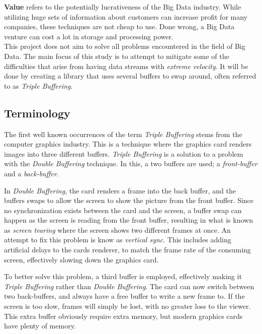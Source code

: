 \documentclass[a4paper]{article}
\begin{document}
\textbf{Value} refers to the potentially lucrativeness of the Big Data industry. While utilizing huge sets of information about customers can increase profit for many companies, these techniques are not cheap to use. Done wrong, a Big Data venture can cost a lot in storage and processing power.\\


This project does not aim to solve all problems encountered in the field of Big Data. The main focus of this study is to attempt to mitigate some of the difficulties that arise from having data streams with \textit{extreme velocity}. It will be done by creating a  library that uses several buffers to swap around, often referred to as \textit{Triple Buffering}.


\subsection{Terminology}
The first well known occurrences of the term \textit{Triple Buffering} stems from the computer graphics industry\cite{3buf}. This is a technique where the graphics card renders images into three different buffers. \textit{Triple Buffering} is a solution to a problem with the \textit{Double Buffering} technique. In this, a two buffers are used; a \textit{front-buffer} and a \textit{back-buffer}. 

In \textit{Double Buffering}, the card renders a frame into the back buffer, and the buffers swaps to allow the screen to show the picture from the front buffer. Since no synchronization exists between the card and the screen, a buffer swap can happen as the screen is reading from the front buffer, resulting in what is known as \textit{screen tearing} where the screen shows two different frames at once. An attempt to fix this problem is know as \textit{vertical sync}. This includes adding artificial delays to the cards renderer, to match the frame rate of the consuming screen, effectively slowing down the graphics card.

To better solve this problem, a third buffer is employed, effectively making it \textit{Triple Buffering} rather than \textit{Double Buffering}. The card can now switch between two back-buffers, and always have a free buffer to write a new frame to. If the screen is too slow, frames will simply be lost, with no greater loss to the viewer. This extra buffer obviously require extra memory, but modern graphics cards have plenty of memory.\\
\end{document}
